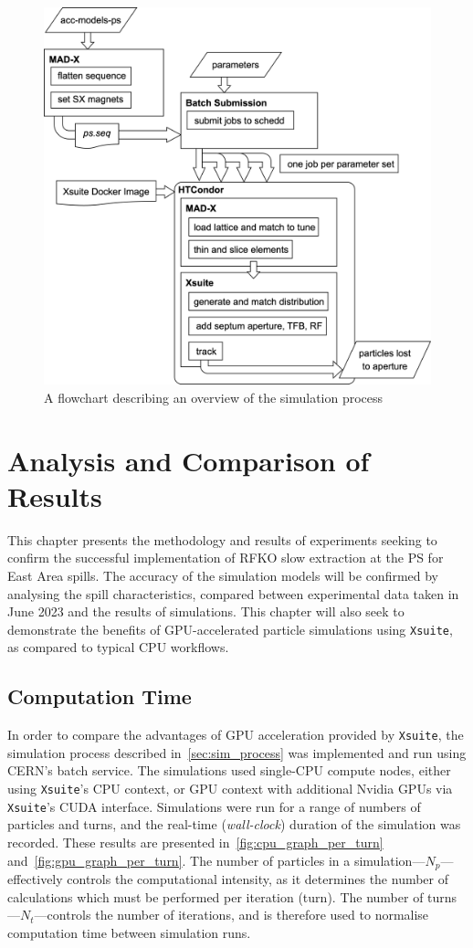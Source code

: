 \documentclass[a4paper,twoside,11pt]{report}
\begin{document}
\begin{figure}[h]
  \centering
  \includegraphics*[width=0.85\linewidth]{simulation-flowchart.png}
  \caption{A flowchart describing an overview of the simulation process}\label{fig:flowchart}
\end{figure}


\chapter{Analysis and Comparison of Results}\label{chap:results}
This chapter presents the methodology and results of experiments seeking to confirm the successful implementation of RFKO slow extraction at the PS for East Area spills. The accuracy of the simulation models will be confirmed by analysing the spill characteristics, compared between experimental data taken in June 2023 and the results of simulations. This chapter will also seek to demonstrate the benefits of GPU-accelerated particle simulations using \verb|Xsuite|, as compared to typical CPU workflows.


\section{Computation Time}

In order to compare the advantages of GPU acceleration provided by \verb|Xsuite|, the simulation process described in~\autoref{sec:sim_process} was implemented and run using CERN's batch service. The simulations used single-CPU compute nodes, either using \verb|Xsuite|'s CPU context, or GPU context with additional Nvidia GPUs via \verb|Xsuite|'s CUDA interface. Simulations were run for a range of numbers of particles and turns, and the real-time (\textit{wall-clock}) duration of the simulation was recorded. These results are presented in~\autoref{fig:cpu_graph_per_turn} and~\autoref{fig:gpu_graph_per_turn}. The number of particles in a simulation---$N_p$---effectively controls the computational intensity, as it determines the number of calculations which must be performed per iteration (turn). The number of turns---$N_t$---controls the number of iterations, and is therefore used to normalise computation time between simulation runs.
\end{document}
